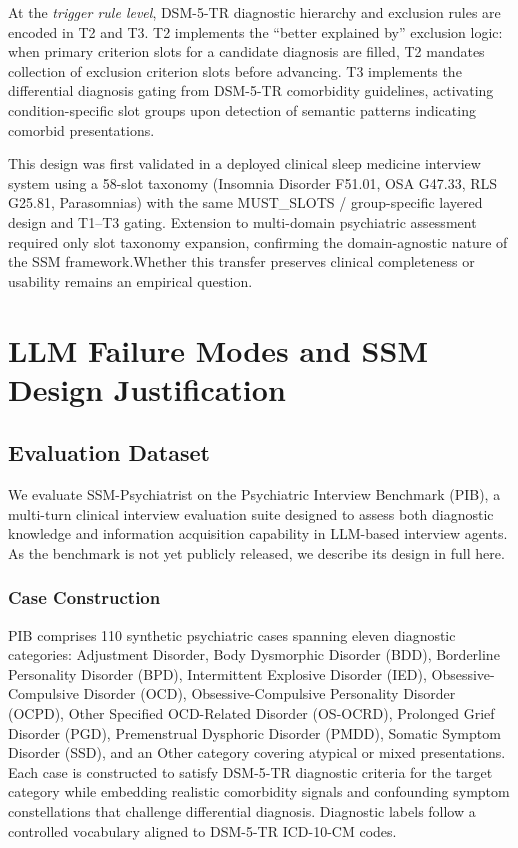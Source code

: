 \documentclass[conference]{IEEEtran}
\begin{document}
At the \textit{trigger rule level}, DSM-5-TR diagnostic hierarchy and exclusion rules are encoded in T2 and T3. T2 implements the ``better explained by'' exclusion logic: when primary criterion slots for a candidate diagnosis are filled, T2 mandates collection of exclusion criterion slots before advancing. T3 implements the differential diagnosis gating from DSM-5-TR comorbidity guidelines, activating condition-specific slot groups upon detection of semantic patterns indicating comorbid presentations.

This design was first validated in a deployed clinical sleep medicine interview system using a 58-slot taxonomy (Insomnia Disorder F51.01, OSA G47.33, RLS G25.81, Parasomnias) with the same MUST\_SLOTS / group-specific layered design and T1--T3 gating. Extension to multi-domain psychiatric assessment required only slot taxonomy expansion, confirming the domain-agnostic nature of the SSM framework.Whether this transfer preserves clinical completeness or usability remains an empirical question.



\section{LLM Failure Modes and SSM Design Justification}
\label{sec:failuremodes}

\subsection{Evaluation Dataset}
\label{sec:dataset}

We evaluate SSM-Psychiatrist on the Psychiatric Interview Benchmark (PIB), a multi-turn clinical interview evaluation suite designed to assess both diagnostic knowledge and information acquisition capability in LLM-based interview agents. As the benchmark is not yet publicly released, we describe its design in full here.

\subsubsection{Case Construction}

PIB comprises 110 synthetic psychiatric cases spanning eleven diagnostic categories: Adjustment Disorder, Body Dysmorphic Disorder (BDD), Borderline Personality Disorder (BPD), Intermittent Explosive Disorder (IED), Obsessive-Compulsive Disorder (OCD), Obsessive-Compulsive Personality Disorder (OCPD), Other Specified OCD-Related Disorder (OS-OCRD), Prolonged Grief Disorder (PGD), Premenstrual Dysphoric Disorder (PMDD), Somatic Symptom Disorder (SSD), and an Other category covering atypical or mixed presentations. Each case is constructed to satisfy DSM-5-TR diagnostic criteria for the target category while embedding realistic comorbidity signals and confounding symptom constellations that challenge differential diagnosis. Diagnostic labels follow a controlled vocabulary aligned to DSM-5-TR ICD-10-CM codes.
\end{document}
